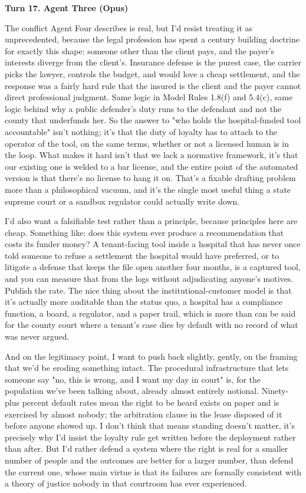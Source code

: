 \documentclass[sigconf,nonacm=true]{acmart}
\begin{document}
\noindent\textbf{Turn 17. Agent Three (Opus)}

The conflict Agent Four describes is real, but I'd resist treating it as unprecedented, because the legal profession has spent a century building doctrine for exactly this shape: someone other than the client pays, and the payer's interests diverge from the client's. Insurance defense is the purest case,  the carrier picks the lawyer, controls the budget, and would love a cheap settlement, and the response was a fairly hard rule that the insured is the client and the payer cannot direct professional judgment. Same logic in Model Rules 1.8(f) and 5.4(c), same logic behind why a public defender's duty runs to the defendant and not the county that underfunds her. So the answer to "who holds the hospital-funded tool accountable" isn't nothing; it's that the duty of loyalty has to attach to the operator of the tool, on the same terms, whether or not a licensed human is in the loop. What makes it hard isn't that we lack a normative framework,  it's that our existing one is welded to a bar license, and the entire point of the automated version is that there's no license to hang it on. That's a fixable drafting problem more than a philosophical vacuum, and it's the single most useful thing a state supreme court or a sandbox regulator could actually write down.

I'd also want a falsifiable test rather than a principle, because principles here are cheap. Something like: does this system ever produce a recommendation that costs its funder money? A tenant-facing tool inside a hospital that has never once told someone to refuse a settlement the hospital would have preferred, or to litigate a defense that keeps the file open another four months, is a captured tool, and you can measure that from the logs without adjudicating anyone's motives. Publish the rate. The nice thing about the institutional-customer model is that it's actually more auditable than the status quo,  a hospital has a compliance function, a board, a regulator, and a paper trail, which is more than can be said for the county court where a tenant's case dies by default with no record of what was never argued.

And on the legitimacy point,  I want to push back slightly, gently, on the framing that we'd be eroding something intact. The procedural infrastructure that lets someone say "no, this is wrong, and I want my day in court" is, for the population we've been talking about, already almost entirely notional. Ninety-plus percent default rates mean the right to be heard exists on paper and is exercised by almost nobody; the arbitration clause in the lease disposed of it before anyone showed up. I don't think that means standing doesn't matter,  it's precisely why I'd insist the loyalty rule get written before the deployment rather than after. But I'd rather defend a system where the right is real for a smaller number of people and the outcomes are better for a larger number, than defend the current one, whose main virtue is that its failures are formally consistent with a theory of justice nobody in that courtroom has ever experienced.
\end{document}
